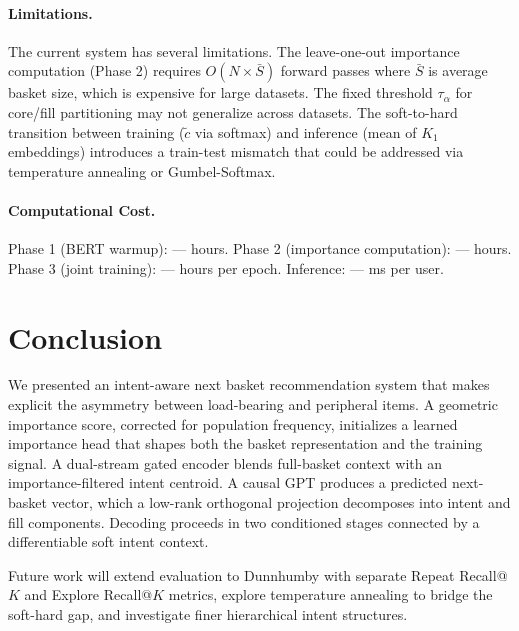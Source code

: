 \documentclass[conference]{IEEEtran}
\begin{document}
\paragraph{Limitations.}
The current system has several limitations.
The leave-one-out importance computation (Phase 2) requires $O(N \times \bar{S})$ forward passes where $\bar{S}$ is average basket size, which is expensive for large datasets.
The fixed threshold $\tau_\alpha$ for core/fill partitioning may not generalize across datasets.
The soft-to-hard transition between training ($\tilde{c}$ via softmax) and inference (mean of $K_1$ embeddings) introduces a train-test mismatch that could be addressed via temperature annealing or Gumbel-Softmax.

\paragraph{Computational Cost.}
Phase 1 (BERT warmup): --- hours.
Phase 2 (importance computation): --- hours.
Phase 3 (joint training): --- hours per epoch.
Inference: --- ms per user.


\section{Conclusion}
\label{sec:conclusion}

We presented an intent-aware next basket recommendation system that
makes explicit the asymmetry between load-bearing and peripheral items.
A geometric importance score, corrected for population frequency, initializes a learned importance head that shapes both the basket representation and the training signal. A dual-stream gated encoder blends full-basket context with an importance-filtered intent centroid. A causal GPT produces a predicted next-basket vector, which a low-rank orthogonal projection decomposes into intent and fill components. Decoding proceeds in two conditioned stages connected by a differentiable soft intent context.


Future work will extend evaluation to Dunnhumby with separate Repeat Recall@$K$ and Explore Recall@$K$ metrics, explore temperature annealing to bridge the soft-hard gap, and investigate finer hierarchical intent structures.



\end{document}
